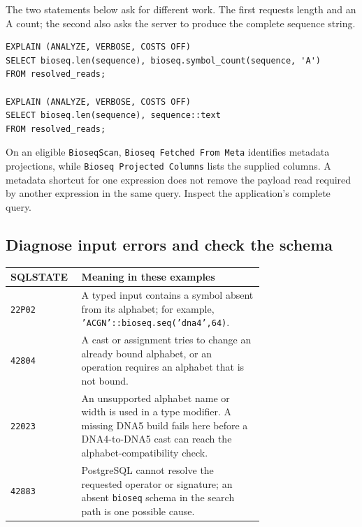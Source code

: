 The two statements below ask for different work. The first requests length
and an A count; the second also asks the server to produce the complete
sequence string.

\par\noindent\begin{minipage}{\linewidth}
\begin{lstlisting}[style=bioseq-appendix-sql]
EXPLAIN (ANALYZE, VERBOSE, COSTS OFF)
SELECT bioseq.len(sequence), bioseq.symbol_count(sequence, 'A')
FROM resolved_reads;

EXPLAIN (ANALYZE, VERBOSE, COSTS OFF)
SELECT bioseq.len(sequence), sequence::text
FROM resolved_reads;
\end{lstlisting}
\end{minipage}

On an eligible \texttt{BioseqScan}, \texttt{Bioseq Fetched From Meta}
identifies metadata projections, while \texttt{Bioseq Projected Columns}
lists the supplied columns. A metadata shortcut for one expression does
not remove the payload read required by another expression in the same
query. Inspect the application's complete query.

\subsection{Diagnose input errors and check the schema}

\begin{center}
\small
\begin{tabular}{@{}lp{0.72\linewidth}@{}}
\toprule
SQLSTATE & Meaning in these examples \\
\midrule
\texttt{22P02} & A typed input contains a symbol absent from its alphabet;
  for example, \texttt{'ACGN'::bioseq.seq('dna4',64)}. \\
\texttt{42804} & A cast or assignment tries to change an already bound
  alphabet, or an operation requires an alphabet that is not bound. \\
\texttt{22023} & An unsupported alphabet name or width is used in a type
  modifier. A missing DNA5 build fails here before a DNA4-to-DNA5 cast can
  reach the alphabet-compatibility check. \\
\texttt{42883} & PostgreSQL cannot resolve the requested operator or
  signature; an absent \texttt{bioseq} schema in the search path is one
  possible cause. \\
\bottomrule
\end{tabular}
\end{center}

